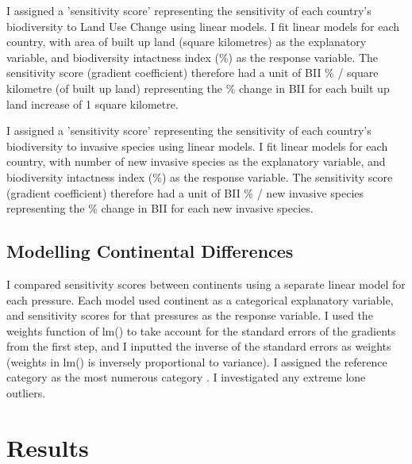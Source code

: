 \documentclass[11pt, a4paper, titlepage]{article}
\begin{document}
	I assigned a 'sensitivity score' representing the sensitivity of each country's biodiversity to Land Use Change using linear models. I fit linear models for each country, with area of built up land (square kilometres) as the explanatory variable, and biodiversity intactness index (\%) as the response variable. The sensitivity score (gradient coefficient) therefore had a unit of BII \% / square kilometre (of built up land) representing the \% change in BII for each built up land increase of 1 square kilometre.
	
	I assigned a 'sensitivity score' representing the sensitivity of each country's biodiversity to invasive species using linear models. I fit linear models for each country, with number of new invasive species as the explanatory variable, and biodiversity intactness index (\%) as the response variable. The sensitivity score (gradient coefficient) therefore had a unit of BII \% / new invasive species representing the \% change in BII for each new invasive species. 

	\subsection*{Modelling Continental Differences}
	
	I compared sensitivity scores between continents using a separate linear model for each pressure. Each model used continent as a categorical explanatory variable, and sensitivity scores for that pressures as the response variable. I used the weights function of lm() to take account for the standard errors of the gradients from the first step, and I inputted the inverse of the standard errors as weights (weights in lm() is inversely proportional to variance). I assigned the reference category as the most numerous category \citep{peng2014discrepancy}. I investigated any extreme lone outliers.
	
	\clearpage

	\section*{Results}
\end{document}
